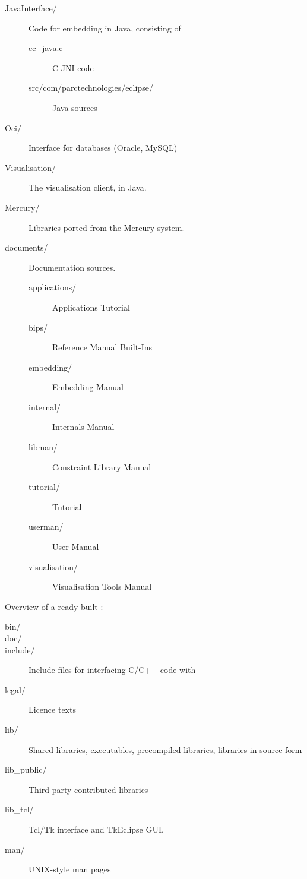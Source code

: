 \documentclass[11pt,a4paper]{book}
\begin{document}
\begin{description}
\item[JavaInterface/] Code for embedding {\eclipse} in Java, consisting of
    \begin{description}
    \item[ec_java.c] C JNI code
    \item[src/com/parctechnologies/eclipse/] Java sources
    \end{description}
\item[Oci/] Interface for databases (Oracle, MySQL)
\item[Visualisation/] The visualisation client, in Java.
\item[Mercury/] Libraries ported from the Mercury system.
\item[documents/] Documentation sources.
    \begin{description}
    \item[applications/] Applications Tutorial
    \item[bips/] Reference Manual Built-Ins
    \item[embedding/] Embedding Manual
    \item[internal/] Internals Manual
    \item[libman/] Constraint Library Manual
    \item[tutorial/] {\eclipse} Tutorial
    \item[userman/] User Manual
    \item[visualisation/] Visualisation Tools Manual
    \end{description}
\end{description}

Overview of a ready built {\eclipse}:
\begin{description}
\item[bin/] 
\item[doc/] 
\item[include/] Include files for interfacing C/C++ code with {\eclipse}
\item[legal/] Licence texts
\item[lib/] Shared libraries, executables, precompiled {\eclipse} libraries,
	{\eclipse} libraries in source form
\item[lib_public/] Third party contributed libraries
\item[lib_tcl/] Tcl/Tk interface and TkEclipse GUI.
\item[man/] UNIX-style man pages
\end{description}
 

\end{document}
